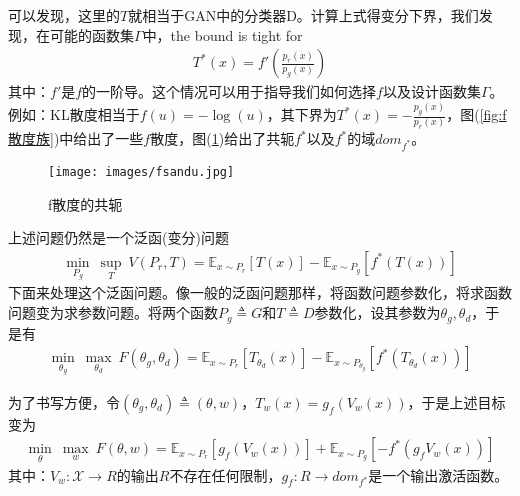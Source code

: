             \par
            可以发现，这里的$T$就相当于GAN中的分类器D。计算上式得变分下界，我们发现，在可能的函数集$\Gamma$中，the bound is tight for
            \begin{align*}
            T^*(x) = f' \left( \frac{p_r(x)}{p_g(x)} \right)
            \end{align*}
            其中：$f'$是$f$的一阶导。这个情况可以用于指导我们如何选择$f$以及设计函数集$\Gamma$。例如：KL散度相当于$f(u) = -\log (u)$，其下界为$T^*(x) = -\frac{p_g(x)}{p_r(x)}$，图(\ref{fig:f散度族})中给出了一些$f$散度，图(\ref{fig:f散度的共轭})给出了共轭$f^*$以及$f^*$的域$dom_{f^*}$。
                \begin{figure}[H]
                \centering
                \texttt{[image: images/fsandu.jpg]}
                \caption{f散度的共轭}
                \label{fig:f散度的共轭}
                \end{figure}
            \par
            上述问题仍然是一个泛函(变分)问题
            \begin{align*}
            \min_{P_g} \ \sup_{T}\ V(P_r,T) = \mathbb{E}_{x\sim P_r}[T(x)] - \mathbb{E}_{x\sim P_g}[f^*(T(x))]
            \end{align*}
            下面来处理这个泛函问题。像一般的泛函问题那样，将函数问题参数化，将求函数问题变为求参数问题。将两个函数$P_g \triangleq G $和$T\triangleq D$参数化，设其参数为$\theta_g,\theta_d$，于是有
            \begin{align*}
            \min_{\theta_g} \ \max_{\theta_d}\ F(\theta_g,\theta_d) = \mathbb{E}_{x\sim P_r}[T_{\theta_d}(x)] - \mathbb{E}_{x\sim P_{\theta_g}}[f^*(T_{\theta_d}(x))]
            \end{align*}
            \par
            为了书写方便，令$(\theta_g,\theta_d) \triangleq (\theta,w)$，$T_w(x)  = g_f(V_w(x))$，于是上述目标变为
            \begin{align*}
            \min_\theta \ \max_w \ F(\theta,w) = \mathbb{E}_{x\sim P_r}[g_f(V_w(x))] + \mathbb{E}_{x\sim P_g}[-f^*(g_fV_w(x))]
            \end{align*}
            其中：$V_w:\mathcal{X}\to R$的输出$R$不存在任何限制，$g_f:R\to dom_{f^*}$是一个输出激活函数。
